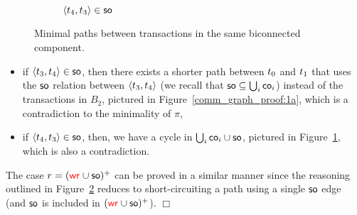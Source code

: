 \begin{figure}
\begin{subfigure}{.26\textwidth}
{  
   }
   \caption{${\left\langle{{t}_4,{t}_3}\right\rangle} \in \mathsf{so}$}
   \label{comm_graph_proof:1b}
  \end{subfigure}
   \vspace{-2mm}
  \caption{Minimal paths between transactions in the same biconnected component.}
  \label{comm_graph_proof:1}
 \end{figure}
 \begin{itemize}
  \item if ${\left\langle{{t}_3, {t}_4}\right\rangle} \in \mathsf{so}$, then there exists a shorter path between ${t}_0$ and ${t}_1$ that uses the $\mathsf{so}$ relation between ${\left\langle{{t}_3, {t}_4}\right\rangle}$ (we recall that $\mathsf{so}\subseteq \bigcup_i \mathsf{co}_i$) instead of the transactions in $B_2$, pictured in Figure~\ref{comm_graph_proof:1a}, which is a contradiction to the minimality of $\pi$,
  \item if ${\left\langle{{t}_4, {t}_3}\right\rangle} \in \mathsf{so}$, then, we have a cycle in ${\bigcup_i \mathsf{co}_i\cup\mathsf{so}}$, pictured in Figure~\ref{comm_graph_proof:1b}, which is also a contradiction.
 \end{itemize}
 
 The case $r=(\textcolor{red}{\mathsf{wr}_{}} \cup \mathsf{so})^+$
 can be proved in a similar manner since the reasoning outlined in Figure~\ref{comm_graph_proof:1} reduces to short-circuiting a path using a single $\mathsf{so}$ edge (and $\mathsf{so}$ is included in $(\textcolor{red}{\mathsf{wr}_{}} \cup \mathsf{so})^+$). \hfill $\Box$
 
%  
  
